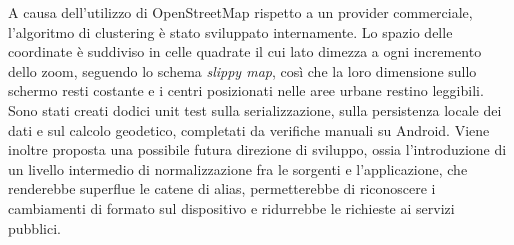 \documentclass[a4paper, oneside, openright]{book}
\begin{document}
A causa dell'utilizzo di OpenStreetMap rispetto a un provider commerciale, l'algoritmo di clustering è stato
sviluppato internamente.
Lo spazio delle coordinate è suddiviso in celle quadrate il cui lato dimezza a ogni incremento
dello zoom, seguendo lo schema \emph{slippy map}, così che la loro dimensione sullo schermo resti costante e i centri
posizionati nelle aree urbane restino leggibili.
Sono stati creati dodici unit test sulla serializzazione, sulla persistenza locale dei dati e sul calcolo geodetico,
completati da verifiche manuali su Android.
Viene inoltre proposta una possibile futura direzione di sviluppo, ossia l'introduzione di un livello intermedio di normalizzazione
fra le sorgenti e l'applicazione, che renderebbe superflue le catene di alias, permetterebbe di riconoscere i cambiamenti
di formato sul dispositivo e ridurrebbe le richieste ai servizi pubblici.

\end{document}
